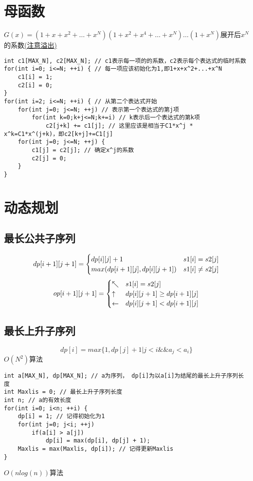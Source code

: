 \documentclass[a4paper]{ctexrep}
\begin{document}
\section{母函数}
$G(x)=(1+x+x^2+\dots+x^N)(1+x^2+x^4+\dots+x^N)\dots(1+x^N)$展开后$x^N$的系数\underline{(注意溢出)}\\
\begin{lstlisting}
int c1[MAX_N], c2[MAX_N]; // c1表示每一项的的系数，c2表示每个表达式的临时系数
for(int i=0; i<=N; ++i) { // 每一项应该初始化为1,即1+x+x^2+...+x^N
	c1[i] = 1;
	c2[i] = 0;
}
for(int i=2; i<=N; ++i) { // 从第二个表达式开始
	for(int j=0; j<=N; ++j) // 表示第一个表达式的第j项
		for(int k=0;k+j<=N;k+=i) // k表示后一个表达式的第k项
			c2[j+k] += c1[j]; // 这里应该是相当于C1*x^j * x^k=C1*x^(j+k)，即c2[k+j]+=C1[j]
	for(int j=0; j<=N; ++j) {
		c1[j] = c2[j]; // 确定x^j的系数
		c2[j] = 0;
	}
}
\end{lstlisting}
\section{动态规划}
\subsection{最长公共子序列}
$$
dp[i+1][j+1]=\begin{cases}
	dp[i][j]+1 & s1[i]=s2[j] \cr
	max(dp[i+1][j], dp[i][j+1]) & s1[i] \neq s2[j]
\end{cases}
$$
$$
op[i+1][j+1]=\begin{cases}
	\nwarrow & s1[i]=s2[j] \cr
	\uparrow & dp[i][j+1] \geq dp[i+1][j] \cr
	\leftarrow & dp[i][j+1] < dp[i+1][j] \cr
\end{cases}
$$
\subsection{最长上升子序列}
$$dp[i]=max\{1, dp[j]+1 | j<i \&\& a_j<a_i\}$$
$O(N^2)$算法

\begin{lstlisting}
int a[MAX_N], dp[MAX_N]; // a为序列， dp[i]为以a[i]为结尾的最长上升子序列长度
int Maxlis = 0; // 最长上升子序列长度
int n; // a的有效长度
for(int i=0; i<n; ++i) {
	dp[i] = 1; // 记得初始化为1
	for(int j=0; j<i; ++j)
		if(a[i] > a[j])
			dp[i] = max(dp[i], dp[j] + 1);
	Maxlis = max(Maxlis, dp[i]); // 记得更新Maxlis
}
\end{lstlisting}
$O(n log(n))$算法
\end{document}
